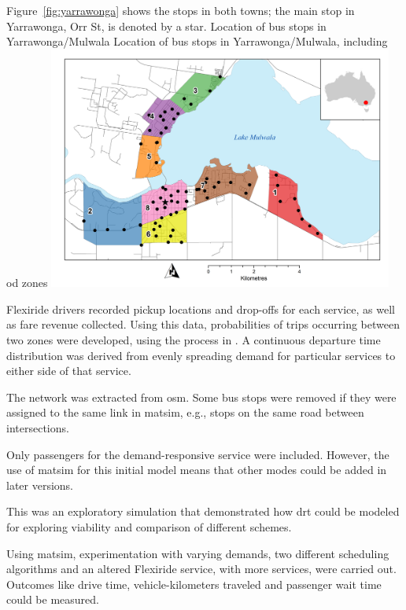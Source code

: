 Figure~\ref{fig:yarrawonga} shows the stops in both towns; the main stop in Yarrawonga, Orr St, is denoted by a star.
%
\createfigure%
{Location of bus stops in Yarrawonga/Mulwala}%
{Location of bus stops in Yarrawonga/Mulwala, including \gls{od} zones}%
{\label{fig:yarrawonga}}%
{\includegraphics[width=0.85\textwidth, angle=0]{./using/figures/yarrawonga_high.png}}%
{}
%

Flexiride drivers recorded pickup locations and drop-offs for each service,
as well as fare revenue collected. Using this data, probabilities of trips
occurring between two zones were developed, using the process in
\citet[][]{Deflorio_ITSIET_2011}. A continuous departure time distribution was
derived from evenly spreading demand for particular services to either side
of that service. 


The network was extracted from \gls{osm}. Some bus stops were removed if they were assigned to the same link in \gls{matsim}, e.g., stops on the same road between intersections.

Only passengers for the demand-responsive service were included. However, the use of \gls{matsim} for this initial model means that other modes could be added in later versions.


This was an exploratory simulation that demonstrated how \gls{drt} could be modeled for exploring viability and comparison of different schemes.

Using \gls{matsim}, experimentation with varying demands, two different scheduling
algorithms and an altered Flexiride service, with more services, were
carried out. Outcomes like drive time, vehicle-kilometers traveled and
passenger wait time could be measured.

